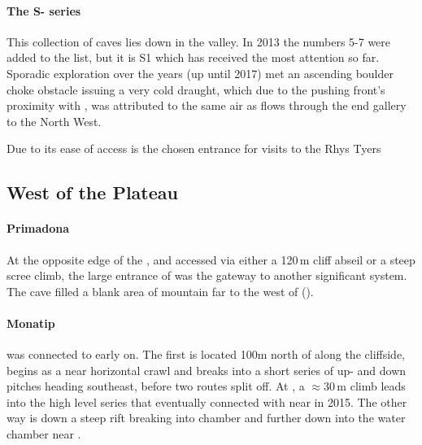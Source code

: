 \paragraph{The S- series}  This collection of caves lies down in   the  valley. In 2013 the numbers 5-7 were added to the list, but it is S1 which has received the most attention so far. Sporadic exploration over the years (up until 2017) met an ascending boulder choke obstacle issuing a very cold draught, which due to the pushing front's proximity with , was attributed to the same air as flows through the end  gallery to the North West.

\begin{marginfigure}
\checkoddpage \ifoddpage \forcerectofloat \else \forceversofloat \fi
\centering
 \caption{Due to its ease of access \protect{} is the chosen entrance for visits to the \protect{} \pic Rhys Tyers}
 \label{surfaceM16}
\end{marginfigure}

\subsection{West of the Plateau} 

\paragraph{Primadona} At the opposite edge of the , and accessed via either a 120\,m cliff abseil or a steep scree climb, the large entrance of  was the gateway to another significant system. The cave filled a blank area of mountain far to the west of  ().

\paragraph{Monatip}  was connected to  early on. The first is located 100m north of  along the cliffside, begins as a near horizontal crawl and breaks into a short series of up- and down pitches heading southeast, before two routes split off. At , a $\approx30$\,m climb leads into the high level series that eventually connected with  near  in 2015. The other way is down a steep rift breaking into  chamber and further down into the water chamber near .

